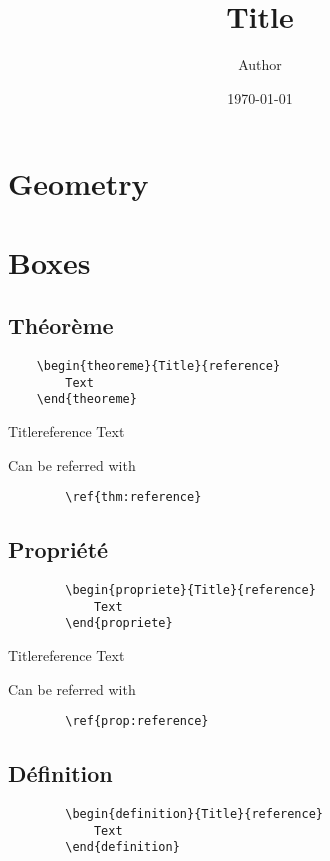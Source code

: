 \documentclass[french]{article}
\title{Title}
\date{\today{}}
\author{Author}
\begin{document}
\maketitle
    \section{Geometry}
    \lipsum[0-3]

    \section{Boxes}

    \subsection{Théorème}
    
    \begin{verbatim}
    \begin{theoreme}{Title}{reference}
        Text
    \end{theoreme}
    \end{verbatim}

    \begin{theoreme}{Title}{reference}
        Text
    \end{theoreme}

    Can be referred with 
    \begin{verbatim} 
        \ref{thm:reference}
    \end{verbatim}

    \subsection{Propriété}
    \begin{verbatim}
        \begin{propriete}{Title}{reference}
            Text
        \end{propriete}
    \end{verbatim}

    \begin{propriete}{Title}{reference}
        Text
    \end{propriete}

    Can be referred with 
    \begin{verbatim} 
        \ref{prop:reference}
    \end{verbatim}

    \subsection{Définition}
    \begin{verbatim}
        \begin{definition}{Title}{reference}
            Text
        \end{definition}
    \end{verbatim}
\end{document}
